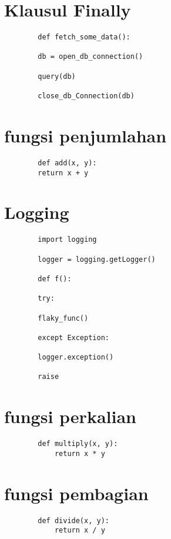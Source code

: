 \documentclass{article}
\begin{document}
	\section {Klausul Finally}
	\begin{lstlisting}
		def fetch_some_data():
		
		db = open_db_connection()
		
		query(db)
		
		close_db_Connection(db)
	\end{lstlisting}
	
	\section {fungsi penjumlahan}
	\begin{lstlisting}
		def add(x, y):
		return x + y
	\end{lstlisting}
	
	\section {Logging}
	\begin{lstlisting}
		import logging
		
		logger = logging.getLogger()
		
		def f():
		
		try:
		
		flaky_func()
		
		except Exception:
		
		logger.exception()
		
		raise
	\end{lstlisting}
	
	\section {fungsi perkalian}
	\begin{lstlisting}
		def multiply(x, y):
			return x * y
	\end{lstlisting}
	
	\section {fungsi pembagian}
	\begin{lstlisting}
		def divide(x, y):
			return x / y
	\end{lstlisting}
	
\end{document}

